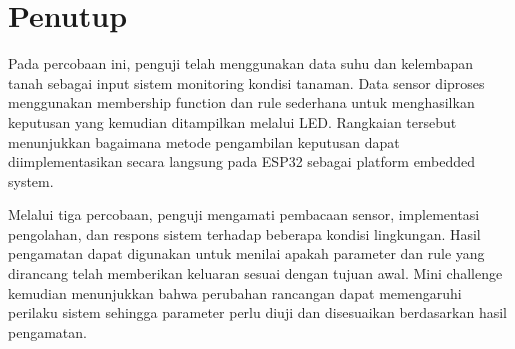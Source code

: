 \documentclass[12pt,a4paper]{article}
\begin{document}
\vspace{0.4cm}
\makebox[\textwidth]{\hrulefill}

\section{Penutup}

Pada percobaan ini, penguji telah menggunakan data suhu dan kelembapan tanah sebagai input sistem monitoring kondisi tanaman. Data sensor diproses menggunakan membership function dan rule sederhana untuk menghasilkan keputusan yang kemudian ditampilkan melalui LED. Rangkaian tersebut menunjukkan bagaimana metode pengambilan keputusan dapat diimplementasikan secara langsung pada ESP32 sebagai platform embedded system.

Melalui tiga percobaan, penguji mengamati pembacaan sensor, implementasi pengolahan, dan respons sistem terhadap beberapa kondisi lingkungan. Hasil pengamatan dapat digunakan untuk menilai apakah parameter dan rule yang dirancang telah memberikan keluaran sesuai dengan tujuan awal. Mini challenge kemudian menunjukkan bahwa perubahan rancangan dapat memengaruhi perilaku sistem sehingga parameter perlu diuji dan disesuaikan berdasarkan hasil pengamatan.
\end{document}
